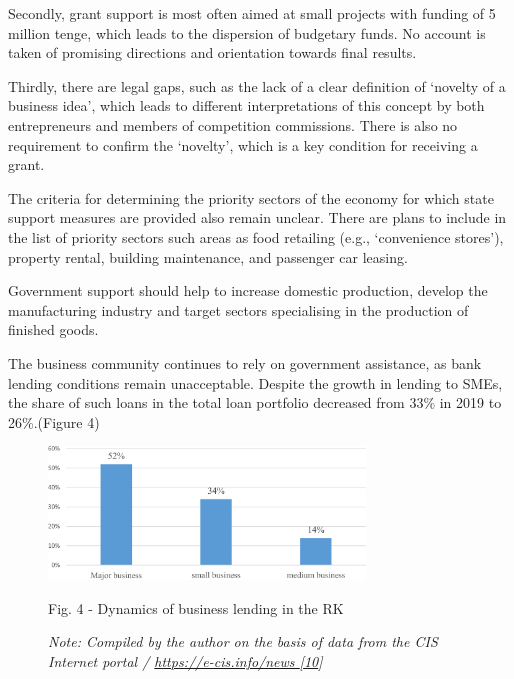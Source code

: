 \begin{multicols}{2}
Secondly, grant support is most often aimed at small projects with
funding of 5 million tenge, which leads to the dispersion of budgetary
funds. No account is taken of promising directions and orientation
towards final results.

Thirdly, there are legal gaps, such as the lack of a clear definition of
`novelty of a business idea', which leads to different interpretations
of this concept by both entrepreneurs and members of competition
commissions. There is also no requirement to confirm the `novelty',
which is a key condition for receiving a grant.

The criteria for determining the priority sectors of the economy for
which state support measures are provided also remain unclear. There are
plans to include in the list of priority sectors such areas as food
retailing (e.g., `convenience stores'), property rental, building
maintenance, and passenger car leasing.

Government support should help to increase domestic production, develop
the manufacturing industry and target sectors specialising in the
production of finished goods.

The business community continues to rely on government assistance, as
bank lending conditions remain unacceptable. Despite the growth in
lending to SMEs, the share of such loans in the total loan portfolio
decreased from 33\% in 2019 to 26\%.(Figure 4)
\end{multicols}

\begin{figure}[H]
	\centering
	\includegraphics[width=0.75\textwidth]{media/ekon/Graph_3}
	\caption*{Fig. 4 - Dynamics of business lending in the RK}
	\caption*{\normalfont \emph{Note: Compiled by the author on the basis of data from the CIS Internet portal / \href{https://e-cis.info/news\%20\%5b10}{https://e-cis.info/news {[}10}{]}}}
\end{figure}

